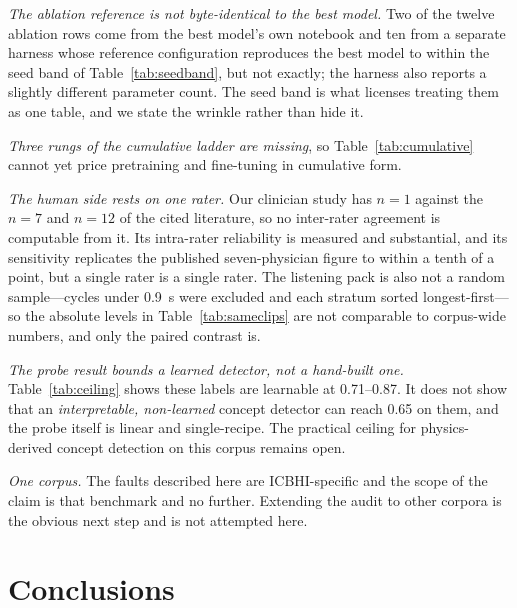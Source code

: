 \documentclass[journal,onecolumn]{IEEEtran}
\begin{document}
\emph{The ablation reference is not byte-identical to the best model.} Two of the
twelve ablation rows come from the best model's own notebook and ten from a
separate harness whose reference configuration reproduces the best model to within
the seed band of Table~\ref{tab:seedband}, but not exactly; the harness also
reports a slightly different parameter count. The seed band is what licenses
treating them as one table, and we state the wrinkle rather than hide it.

\emph{Three rungs of the cumulative ladder are missing}, so Table~\ref{tab:cumulative}
cannot yet price pretraining and fine-tuning in cumulative form.

\emph{The human side rests on one rater.} Our clinician study has $n=1$ against the
$n=7$ and $n=12$ of the cited literature, so no inter-rater agreement is computable
from it. Its intra-rater reliability is measured and substantial, and its
sensitivity replicates the published seven-physician figure to within a tenth of a
point, but a single rater is a single rater. The listening pack is also not a
random sample---cycles under 0.9~s were excluded and each stratum sorted
longest-first---so the absolute levels in Table~\ref{tab:sameclips} are not
comparable to corpus-wide numbers, and only the paired contrast is.

\emph{The probe result bounds a learned detector, not a hand-built one.}
Table~\ref{tab:ceiling} shows these labels are learnable at 0.71--0.87. It does not
show that an \emph{interpretable, non-learned} concept detector can reach 0.65 on
them, and the probe itself is linear and single-recipe. The practical ceiling for
physics-derived concept detection on this corpus remains open.

\emph{One corpus.} The faults described here are ICBHI-specific and the scope of the
claim is that benchmark and no further. Extending the audit to other corpora is the
obvious next step and is not attempted here.

\section{Conclusions}
\label{sec:conclusion}
\end{document}
